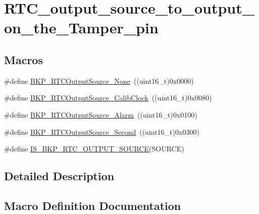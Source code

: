 \hypertarget{group___r_t_c__output__source__to__output__on__the___tamper__pin}{}\section{R\+T\+C\+\_\+output\+\_\+source\+\_\+to\+\_\+output\+\_\+on\+\_\+the\+\_\+\+Tamper\+\_\+pin}
\label{group___r_t_c__output__source__to__output__on__the___tamper__pin}
\subsection*{Macros}
\begin{DoxyCompactItemize}
\item 
\#define \mbox{\hyperlink{group___r_t_c__output__source__to__output__on__the___tamper__pin_ga8a18950396b2db70311480ab76464c6e}{B\+K\+P\+\_\+\+R\+T\+C\+Output\+Source\+\_\+\+None}}~((uint16\+\_\+t)0x0000)
\item 
\#define \mbox{\hyperlink{group___r_t_c__output__source__to__output__on__the___tamper__pin_ga6fd7cb80bb52bca65641cbe6aa2c4590}{B\+K\+P\+\_\+\+R\+T\+C\+Output\+Source\+\_\+\+Calib\+Clock}}~((uint16\+\_\+t)0x0080)
\item 
\#define \mbox{\hyperlink{group___r_t_c__output__source__to__output__on__the___tamper__pin_gac016224386421d0cb1c0cd0ee201d65a}{B\+K\+P\+\_\+\+R\+T\+C\+Output\+Source\+\_\+\+Alarm}}~((uint16\+\_\+t)0x0100)
\item 
\#define \mbox{\hyperlink{group___r_t_c__output__source__to__output__on__the___tamper__pin_ga23cb72635820331317ee4ee5a7897a70}{B\+K\+P\+\_\+\+R\+T\+C\+Output\+Source\+\_\+\+Second}}~((uint16\+\_\+t)0x0300)
\item 
\#define \mbox{\hyperlink{group___r_t_c__output__source__to__output__on__the___tamper__pin_gac59454ee255feb55b5e14c34b70c99da}{I\+S\+\_\+\+B\+K\+P\+\_\+\+R\+T\+C\+\_\+\+O\+U\+T\+P\+U\+T\+\_\+\+S\+O\+U\+R\+CE}}(S\+O\+U\+R\+CE)
\end{DoxyCompactItemize}


\subsection{Detailed Description}


\subsection{Macro Definition Documentation}
\mbox{\label{group___r_t_c__output__source__to__output__on__the___tamper__pin_gac016224386421d0cb1c0cd0ee201d65a}} 

